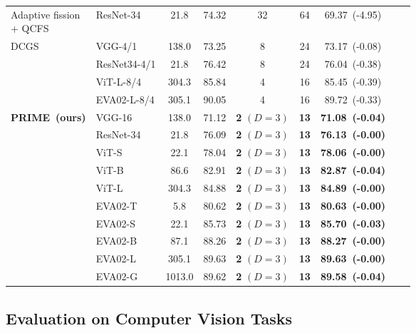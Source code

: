 \begin{table}[t!]
{\begin{tabular}{llccccccc}
    \makecell[l]{Adaptive fission\cite{adaptive}\\ + QCFS\cite{QCFS}}
      & ResNet-34      & 21.8   & 74.32 & 32           & 64          & 69.37~(-4.95) \\
    \cmidrule(lr){2-7}
    \multirow{4}{*}{DCGS\cite{dcgs}}
      & VGG-4/1        & 138.0    & 73.25 &  8         &  24      &  73.17~(-0.08) \\
      & ResNet34-4/1   & 21.8   & 76.42 & 8         &  24      &  76.04~(-0.38) \\
      & ViT-L-8/4      & 304.3  & 85.84 &  4         &  16       &  85.45~(-0.39) \\
      & EVA02-L-8/4    & 305.1  & 90.05 &  4         &  16       & 89.72~(-0.33) \\
    \midrule
    \multirow{10}{*}{\textbf{PRIME~(ours)}}
      & VGG-16         & 138.0    & 71.12 & \textbf{2} $(D{=}3)$  & \textbf{13}          & \textbf{71.08~(-0.04)} \\
      & ResNet-34      & 21.8   & 76.09 & \textbf{2} $(D{=}3)$  & \textbf{13}          & \textbf{76.13~(-0.00)} \\
      & ViT-S          & 22.1   & 78.04 & \textbf{2} $(D{=}3)$  & \textbf{13}          & \textbf{78.06~(-0.00)} \\
      & ViT-B          & 86.6   & 82.91 & \textbf{2} $(D{=}3)$  & \textbf{13}          & \textbf{82.87~(-0.04)} \\
      & ViT-L          & 304.3  & 84.88 & \textbf{2} $(D{=}3)$  & \textbf{13}          & \textbf{84.89~(-0.00)} \\
      & EVA02-T        & 5.8    & 80.62 & \textbf{2} $(D{=}3)$  & \textbf{13}          & \textbf{80.63~(-0.00)} \\
      & EVA02-S        & 22.1   & 85.73 & \textbf{2} $(D{=}3)$  & \textbf{13}          & \textbf{85.70~(-0.03)} \\
      & EVA02-B        & 87.1   & 88.26 & \textbf{2} $(D{=}3)$  & \textbf{13}          & \textbf{88.27~(-0.00)} \\
      & EVA02-L        & 305.1  & 89.63 & \textbf{2} $(D{=}3)$  & \textbf{13}          & \textbf{89.63~(-0.00)} \\
      & EVA02-G        & 1013.0   & 89.62 & \textbf{2} $(D{=}3)$  & \textbf{13}          & \textbf{89.58~(-0.04)} \\
    \bottomrule
  \end{tabular}
  }
\end{table}

\subsection{Evaluation on Computer Vision Tasks}

